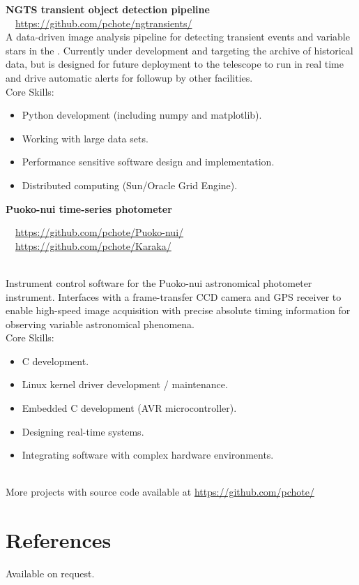 \documentclass[print]{cv-style}
\begin{document}
\parbox[t]{12.8cm}{%
    \textbf{NGTS transient object detection pipeline}%
    \hfill%
    {\small\color{lightgray} \faGithub~~\url{https://github.com/pchote/ngtransients/}}\\%
    A data-driven image analysis pipeline for detecting transient events and variable stars in the .  Currently under development and targeting the archive of historical data, but is designed for future deployment to the telescope to run in real time and drive automatic alerts for followup by other facilities.
    \vspace{\parsep}\\
    Core Skills:
    \begin{itemize}
      \item Python development (including numpy and matplotlib).
      \item Working with large data sets.
      \item Performance sensitive software design and implementation.
      \item Distributed computing (Sun/Oracle Grid Engine).
    \end{itemize}
}

\parbox[t]{12.8cm}{%
    \textbf{Puoko-nui time-series photometer}%
    \hfill{\small\color{lightgray} \parbox{6.4cm}{\faGithub~~\url{https://github.com/pchote/Puoko-nui/} \\ \faGithub~~\url{https://github.com/pchote/Karaka/}}}\\%
    Instrument control software for the Puoko-nui astronomical photometer instrument.  Interfaces with a frame-transfer CCD camera and GPS receiver to enable high-speed image acquisition with precise absolute timing information for observing variable astronomical phenomena.
    \vspace{\parsep}\\
    Core Skills:
    \begin{itemize}
      \item C development.
      \item Linux kernel driver development / maintenance.
      \item Embedded C development (AVR microcontroller).
      \item Designing real-time systems.
      \item Integrating software with complex hardware environments.
    \end{itemize}
}\\

{More projects with source code available at \url{https://github.com/pchote/}\vspace{5mm}}\\

\section{References}
{\small Available on request.}
\end{document}
